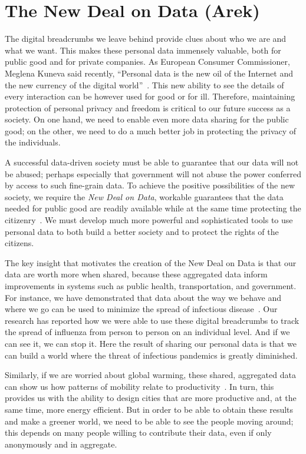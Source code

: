 \section{The New Deal on Data (Arek)}

The digital breadcrumbs we leave behind provide clues about who we are and what we want.
This makes these personal data immensely valuable, both for public good and for private companies.
As European Consumer Commissioner, Meglena Kuneva said recently, ``Personal data is the new oil of the Internet and the new currency of the digital world''~\cite{kuneva2009}.
This new ability to see the details of every interaction can be however used for good or for ill.
Therefore, maintaining protection of personal privacy and freedom is critical to our future success as a society.
On one hand, we need to enable even more data sharing for the public good; on the other, we need to do a much better job in protecting the privacy of the individuals.

A successful data-driven society must be able to guarantee that our data will not be abused; perhaps especially that government will not abuse the power conferred by access to such fine-grain data.
To achieve the positive possibilities of the new society, we require the \emph{New Deal on Data}, workable guarantees that the data needed for public good are readily available while at the same time protecting the citizenry~\cite{pentland2009reality}.
We must develop much more powerful and sophisticated tools to use personal data to both build a better society and to protect the rights of the citizens.

The key insight that motivates the creation of the New Deal on Data is that our data are worth more when shared, because these aggregated data inform improvements in systems such as public health, transportation, and government.
For instance, we have demonstrated that data about the way we behave and where we go can be used to minimize the spread of infectious disease~\cite{madan2010social, pentland2009using}.
Our research has reported how we were able to use these digital breadcrumbs to track the spread of influenza from person to person on an individual level.
And if we can see it, we can stop it.
Here the result of sharing our personal data is that we can build a world where the threat of infectious pandemics is greatly diminished.

Similarly, if we are worried about global warming, these shared, aggregated data can show us how patterns of mobility relate to productivity~\cite{pan2013urban}.
In turn, this provides us with the ability to design cities that are more productive and, at the same time, more energy efficient.
But in order to be able to obtain these results and make a greener world, we need to be able to see the people moving around; this depends on many people willing to contribute their data, even if only anonymously and in aggregate.

